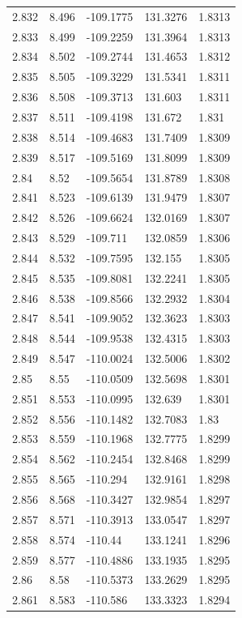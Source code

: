 \begin{tabular}{lllll}
2.832 & 8.496 & -109.1775 & 131.3276 & 1.8313 \\
2.833 & 8.499 & -109.2259 & 131.3964 & 1.8313 \\
2.834 & 8.502 & -109.2744 & 131.4653 & 1.8312 \\
2.835 & 8.505 & -109.3229 & 131.5341 & 1.8311 \\
2.836 & 8.508 & -109.3713 & 131.603 & 1.8311 \\
2.837 & 8.511 & -109.4198 & 131.672 & 1.831 \\
2.838 & 8.514 & -109.4683 & 131.7409 & 1.8309 \\
2.839 & 8.517 & -109.5169 & 131.8099 & 1.8309 \\
2.84 & 8.52 & -109.5654 & 131.8789 & 1.8308 \\
2.841 & 8.523 & -109.6139 & 131.9479 & 1.8307 \\
2.842 & 8.526 & -109.6624 & 132.0169 & 1.8307 \\
2.843 & 8.529 & -109.711 & 132.0859 & 1.8306 \\
2.844 & 8.532 & -109.7595 & 132.155 & 1.8305 \\
2.845 & 8.535 & -109.8081 & 132.2241 & 1.8305 \\
2.846 & 8.538 & -109.8566 & 132.2932 & 1.8304 \\
2.847 & 8.541 & -109.9052 & 132.3623 & 1.8303 \\
2.848 & 8.544 & -109.9538 & 132.4315 & 1.8303 \\
2.849 & 8.547 & -110.0024 & 132.5006 & 1.8302 \\
2.85 & 8.55 & -110.0509 & 132.5698 & 1.8301 \\
2.851 & 8.553 & -110.0995 & 132.639 & 1.8301 \\
2.852 & 8.556 & -110.1482 & 132.7083 & 1.83 \\
2.853 & 8.559 & -110.1968 & 132.7775 & 1.8299 \\
2.854 & 8.562 & -110.2454 & 132.8468 & 1.8299 \\
2.855 & 8.565 & -110.294 & 132.9161 & 1.8298 \\
2.856 & 8.568 & -110.3427 & 132.9854 & 1.8297 \\
2.857 & 8.571 & -110.3913 & 133.0547 & 1.8297 \\
2.858 & 8.574 & -110.44 & 133.1241 & 1.8296 \\
2.859 & 8.577 & -110.4886 & 133.1935 & 1.8295 \\
2.86 & 8.58 & -110.5373 & 133.2629 & 1.8295 \\
2.861 & 8.583 & -110.586 & 133.3323 & 1.8294 \\

\end{tabular}
